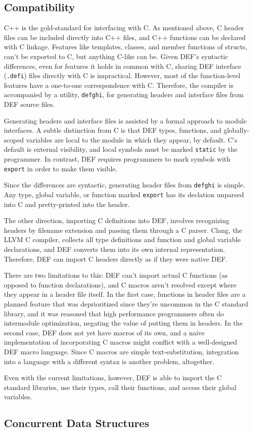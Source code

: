\subsection{Compatibility}

C++ is the gold-standard for interfacing with C.  As mentioned above, C header files can be included directly into C++ files, and C++ functions can be declared with C linkage.  Features like templates, classes, and member functions of structs, can't be exported to C, but anything C-like can be.  Given DEF's syntactic differences, even for features it holds in common with C, sharing DEF interface (\texttt{.defi}) files directly with C is impractical.  However, most of the function-level features have a one-to-one correspondence with C.  Therefore, the compiler is accompanied by a utility, \texttt{defghi}, for generating headers and interface files from DEF source files.

Generating headers and interface files is assisted by a formal approach to module interfaces.  A subtle distinction from C is that DEF types, functions, and globally-scoped variables are local to the module in which they appear, by default.  C's default is external visibility, and local symbols must be marked \texttt{static} by the programmer.  In contrast, DEF requires programmers to mark symbols with \texttt{export} in order to make them visible.

Since the differences are syntactic, generating header files from \texttt{defghi} is simple.  Any type, global variable, or function marked \texttt{export} has its declation unparsed into C and pretty-printed into the header.

The other direction, importing C definitions into DEF, involves recognizing headers by filename extension and passing them through a C parser.  Clang, the LLVM C compiler, collects all type definitions and function and global variable declarations, and DEF converts them into its own internal representation.  Therefore, DEF can import C headers directly as if they were native DEF.

There are two limitations to this: DEF can't import actual C functions (as opposed to function declarations), and C macros aren't resolved except where they appear in a header file itself.  In the first case, functions in header files are a planned feature that was deprioritized since they're uncommon in the C standard library, and it was reasoned that high performance programmers often do intermodule optimization, negating the value of putting them in headers.  In the second case, DEF does not yet have macros of its own, and a naive implementation of incorporating C macros might conflict with a well-designed DEF macro language.  Since C macros are simple text-substitution, integration into a language with a different syntax is another problem, altogether.

Even with the current limitations, however, DEF is able to import the C standard libraries, use their types, call their functions, and access their global variables.

\subsection{Concurrent Data Structures}


